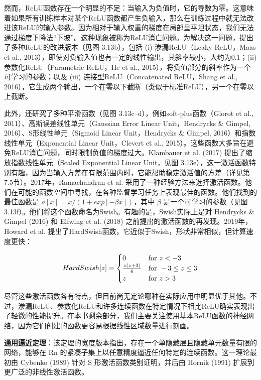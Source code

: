然而，ReLU函数存在一个明显的不足：当输入为负值时，它的导数为零。这意味着如果所有训练样本对某个ReLU函数都产生负输入，那么在训练过程中就无法改进该ReLU的输入参数。因为相对于输入权重的梯度在局部呈平坦状态，我们无法通过梯度下降法“下坡”。这种现象被称为ReLU消亡问题。为解决这一问题，提出了多种ReLU的改进版本（见图 3.13b），包括 (i) 渗漏ReLU（Leaky ReLU，Maas et al., 2013），即使对负输入值也有一定的线性输出，其斜率较小，大约为0.1；(ii) 参数化ReLU（Parametric ReLU，He et al., 2015），将负值部分的斜率作为一个可学习的参数；以及 (iii) 连接型ReLU（Concatenated ReLU，Shang et al., 2016），它生成两个输出，一个在零以下截断（类似于标准ReLU），另一个在零以上截断。

此外，还研究了多种平滑函数（见图 3.13c–d），例如soft-plus函数（Glorot et al., 2011）、高斯误差线性单元（Gaussian Error Linear Unit，Hendrycks \& Gimpel, 2016）、S形线性单元（Sigmoid Linear Unit，Hendrycks \& Gimpel, 2016）和指数线性单元（Exponential Linear Unit，Clevert et al., 2015）。这些函数大多旨在避免ReLU消亡问题，同时限制负值的梯度过大。Klambauer et al. (2017) 提出了缩放指数线性单元（Scaled Exponential Linear Unit，见图 3.13e），这一激活函数特别有趣，因为当输入方差在有限范围内时，它能帮助稳定激活值的方差（详见第7.5节）。2017年，Ramachandran et al. 采用了一种经验方法来选择激活函数。他们在可能的函数空间中寻找，在各种监督学习任务上表现最佳的函数。他们找到的最佳函数是 \(a[x] = x/(1 + exp[−\beta x])\)，其中 \(\beta\) 是一个可学习的参数（见图 3.13f）。他们将这个函数命名为Swish。有趣的是，Swish实际上是对 Hendrycks \& Gimpel (2016) 和 Elfwing et al. (2018) 之前提出的激活函数的再发现。2019年，Howard et al. 提出了HardSwish函数，它近似于Swish，形状非常相似，但计算速度更快：

\begin{equation}
HardSwish[z] =
\begin{cases} 
	0 & \text{for } z < -3 \notag \\
	\frac{z(z + 3)}{6} & \text{for } -3 \leq z \leq 3 \notag \\
	z & \text{for } z > 3 
\end{cases} 
\end{equation}

尽管这些激活函数各有特点，但目前尚无定论哪种在实际应用中明显优于其他。不过，渗漏ReLU、参数化ReLU和许多连续函数在特定情况下相比ReLU确实表现出了轻微的性能提升。在本书剩余部分，我们主要关注使用基本ReLU函数的神经网络，因为它们创建的函数更容易根据线性区域数量进行刻画。

\textbf{通用逼近定理}：该定理的宽度版本指出，存在一个单隐藏层且隐藏单元数量有限的网络，能够在 Rn 的紧凑子集上以任意精度逼近任何特定的连续函数。这一理论最初由 Cybenko (1989) 针对 S 形激活函数类别证明，并后由 Hornik (1991) 扩展到更广泛的非线性激活函数。

